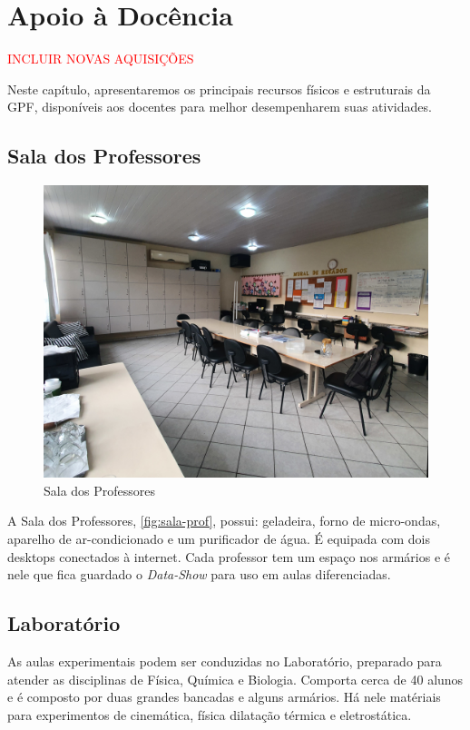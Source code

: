 \chapter{Apoio à Docência} %
\label{chap:Apoio à Docência}
\textcolor{red}{INCLUIR NOVAS AQUISIÇÕES}

Neste capítulo, apresentaremos os principais recursos físicos e estruturais da \ac{GPF}, disponíveis aos docentes para melhor desempenharem suas atividades.

\section{Sala dos Professores} %
\label{sec:Sala dos Professores}

\setlength\intextsep{0pt}
\begin{figure}
	\centering
	\includegraphics[width=.45\textwidth]{assets/sala-prof.jpg}
	\caption{Sala dos Professores}
	\label{fig:sala-prof}
\end{figure}
A Sala dos Professores, \autoref{fig:sala-prof}, possui: geladeira, forno de micro-ondas, aparelho de ar-condicionado e um purificador de água. É equipada com dois desktops conectados à internet. Cada professor tem um espaço nos armários e é nele que fica guardado o \emph{Data-Show} para uso em aulas diferenciadas.

\section{Laboratório} %
\label{sec:Laboratório}
As aulas experimentais podem ser conduzidas no Laboratório, preparado para atender as disciplinas de Física, Química e Biologia. Comporta cerca de 40 alunos e é composto por duas grandes bancadas e alguns armários. Há nele matériais para experimentos de cinemática, física dilatação térmica e eletrostática.

